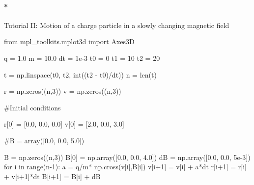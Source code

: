 \documentclass[
  letterpaper,
  DIV=11,
  numbers=noendperiod]{scrreprt}
\let\oldparagraph\paragraph
\renewcommand{\paragraph}[1]{\oldparagraph{#1}\mbox{}}
\newenvironment{Shaded}{\begin{snugshade}}{\end{snugshade}}
\newcommand{\BuiltInTok}[1]{\textcolor[rgb]{0.00,0.23,0.31}{#1}}
\newcommand{\CommentTok}[1]{\textcolor[rgb]{0.37,0.37,0.37}{#1}}
\newcommand{\ControlFlowTok}[1]{\textcolor[rgb]{0.00,0.23,0.31}{#1}}
\newcommand{\DecValTok}[1]{\textcolor[rgb]{0.68,0.00,0.00}{#1}}
\newcommand{\FloatTok}[1]{\textcolor[rgb]{0.68,0.00,0.00}{#1}}
\newcommand{\ImportTok}[1]{\textcolor[rgb]{0.00,0.46,0.62}{#1}}
\newcommand{\KeywordTok}[1]{\textcolor[rgb]{0.00,0.23,0.31}{#1}}
\newcommand{\NormalTok}[1]{\textcolor[rgb]{0.00,0.23,0.31}{#1}}
\newcommand{\OperatorTok}[1]{\textcolor[rgb]{0.37,0.37,0.37}{#1}}
\begin{document}
\paragraph*{Tutorial II: Motion of a charge particle in a slowly
changing magnetic
field}\label{tutorial-ii-motion-of-a-charge-particle-in-a-slowly-changing-magnetic-field}

\begin{Shaded}
\begin{Highlighting}[]
\ImportTok{from}\NormalTok{ mpl\_toolkits.mplot3d }\ImportTok{import}\NormalTok{ Axes3D}

\NormalTok{q }\OperatorTok{=} \FloatTok{1.0}
\NormalTok{m }\OperatorTok{=} \FloatTok{10.0}
\NormalTok{dt }\OperatorTok{=} \FloatTok{1e{-}3}
\NormalTok{t0 }\OperatorTok{=} \DecValTok{0}
\NormalTok{t1 }\OperatorTok{=} \DecValTok{10}
\NormalTok{t2 }\OperatorTok{=} \DecValTok{20}


\NormalTok{t }\OperatorTok{=}\NormalTok{ np.linspace(t0, t2, }\BuiltInTok{int}\NormalTok{((t2 }\OperatorTok{{-}}\NormalTok{ t0)}\OperatorTok{/}\NormalTok{dt))}
\NormalTok{n }\OperatorTok{=} \BuiltInTok{len}\NormalTok{(t)}

\NormalTok{r }\OperatorTok{=}\NormalTok{ np.zeros((n,}\DecValTok{3}\NormalTok{))}
\NormalTok{v }\OperatorTok{=}\NormalTok{ np.zeros((n,}\DecValTok{3}\NormalTok{))}

\CommentTok{\#Initial conditions}

\NormalTok{r[}\DecValTok{0}\NormalTok{] }\OperatorTok{=}\NormalTok{ [}\FloatTok{0.0}\NormalTok{, }\FloatTok{0.0}\NormalTok{, }\FloatTok{0.0}\NormalTok{]}
\NormalTok{v[}\DecValTok{0}\NormalTok{] }\OperatorTok{=}\NormalTok{ [}\FloatTok{2.0}\NormalTok{, }\FloatTok{0.0}\NormalTok{, }\FloatTok{3.0}\NormalTok{]}

\CommentTok{\#B = array([0.0, 0.0, 5.0])}

\NormalTok{B }\OperatorTok{=}\NormalTok{ np.zeros((n,}\DecValTok{3}\NormalTok{))}
\NormalTok{B[}\DecValTok{0}\NormalTok{] }\OperatorTok{=}\NormalTok{ np.array([}\FloatTok{0.0}\NormalTok{, }\FloatTok{0.0}\NormalTok{, }\FloatTok{4.0}\NormalTok{])}
\NormalTok{dB }\OperatorTok{=}\NormalTok{ np.array([}\FloatTok{0.0}\NormalTok{, }\FloatTok{0.0}\NormalTok{, }\FloatTok{5e{-}3}\NormalTok{])}
\ControlFlowTok{for}\NormalTok{ i }\KeywordTok{in} \BuiltInTok{range}\NormalTok{(n}\OperatorTok{{-}}\DecValTok{1}\NormalTok{):}
\NormalTok{    a   }\OperatorTok{=}\NormalTok{ q}\OperatorTok{/}\NormalTok{m}\OperatorTok{*}\NormalTok{ np.cross(v[i],B[i]) }
\NormalTok{    v[i}\OperatorTok{+}\DecValTok{1}\NormalTok{] }\OperatorTok{=}\NormalTok{ v[i] }\OperatorTok{+}\NormalTok{ a}\OperatorTok{*}\NormalTok{dt}
\NormalTok{    r[i}\OperatorTok{+}\DecValTok{1}\NormalTok{] }\OperatorTok{=}\NormalTok{ r[i] }\OperatorTok{+}\NormalTok{ v[i}\OperatorTok{+}\DecValTok{1}\NormalTok{]}\OperatorTok{*}\NormalTok{dt}
\NormalTok{    B[i}\OperatorTok{+}\DecValTok{1}\NormalTok{] }\OperatorTok{=}\NormalTok{ B[i] }\OperatorTok{+}\NormalTok{ dB}


\end{Highlighting}
\end{Shaded}
\end{document}
